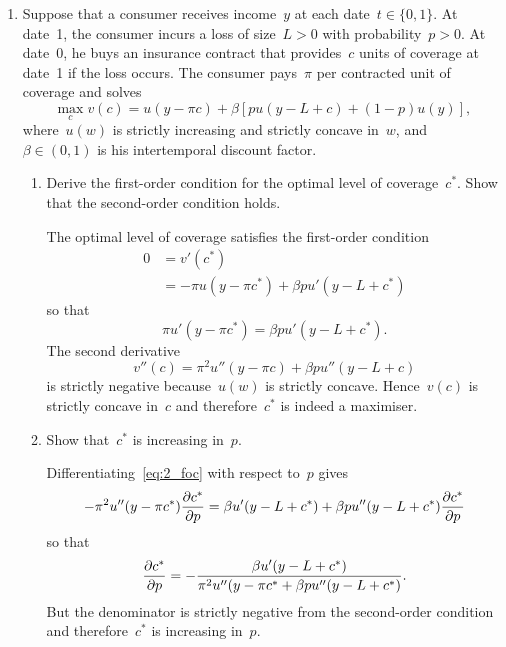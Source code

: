 \begin{enumerate}
\begin{enumerate}
	\end{enumerate}

	\item
	Suppose that a consumer receives income~$y$ at each date~$t\in\{0,1\}$.
	At date~1, the consumer incurs a loss of size~$L>0$ with probability~$p>0$.
	At date~0, he buys an insurance contract that provides~$c$ units of coverage at date~1 if the loss occurs.
	The consumer pays~$\pi$ per contracted unit of coverage and solves
	\[ \max_c v(c)=u(y-\pi c)+\beta[pu(y-L+c)+(1-p)u(y)], \]
	where~$u(w)$ is strictly increasing and strictly concave in~$w$, and~$\beta\in(0,1)$ is his intertemporal discount factor.
	\begin{enumerate}

		\item
		Derive the first-order condition for the optimal level of coverage~$c^*$.
		Show that the second-order condition holds.
		\begin{solution}
			The optimal level of coverage satisfies the first-order condition
			\begin{align}
				0
				&= v'(c^*)\\
				&= -\pi u(y-\pi c^*)+\beta pu'(y-L+c^*)
			\end{align}
			so that
			\[ \pi u'(y-\pi c^*)=\beta pu'(y-L+c^*). \label{eq:2_foc}\]
			The second derivative
			\[ v''(c)=\pi^2 u''(y-\pi c)+\beta pu''(y-L+c) \]
			is strictly negative because~$u(w)$ is strictly concave.
			Hence~$v(c)$ is strictly concave in~$c$ and therefore~$c^*$ is indeed a maximiser.
		\end{solution}

		\item
		Show that~$c^*$ is increasing in~$p$.
		\begin{solution}
			Differentiating~\eqref{eq:2_foc} with respect to~$p$ gives
			\[ -\pi^2u''(y-\pi c^*)\frac{\partial c^*}{\partial p}=\beta u'(y-L+c^*)+\beta pu''(y-L+c^*)\frac{\partial c^*}{\partial p} \]
			so that
			\[ \frac{\partial c^*}{\partial p}=-\frac{\beta u'(y-L+c^*)}{\pi^2u''(y-\pi c^*+\beta pu''(y-L+c^*)}. \]
			But the denominator is strictly negative from the second-order condition and therefore~$c^*$ is increasing in~$p$.
		\end{solution}


\end{enumerate}
\end{enumerate}
